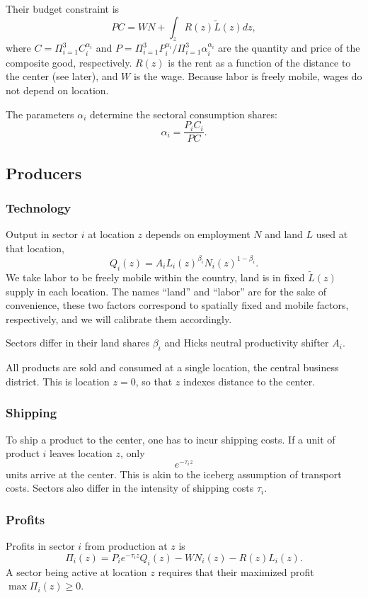 \documentclass[12pt]{article}
\begin{document}

Their budget constraint is
\begin{equation}
\label{eq:BudCons}
PC=WN+\int_z R(z)\tilde{L}(z)dz,
\end{equation}
where $C=\Pi_{i=1}^3C_i^{\alpha_i}$ and $P=\Pi_{i=1}^3P_i^{\alpha_i}/\Pi_{i=1}^3\alpha_i^{\alpha_i}$ are the quantity and price of the composite good, respectively. $R(z)$ is the rent as a function of the distance to the center (see later), and $W$ is the wage. Because labor is freely mobile, wages do not depend on location.

The parameters $\alpha_i$ determine the sectoral consumption shares:
\begin{equation*}
\alpha_i=\frac{P_iC_i}{PC}.
\end{equation*}

\subsection{Producers}
\subsubsection{Technology}
Output in sector $i$ at location $z$ depends on employment $N$ and land $L$ used at that location,
\[
Q_i(z) = A_i L_i(z)^{\beta_i}N_i(z)^{1-\beta_i}.
\]
We take labor to be freely mobile within the country, land is in fixed $\tilde{L}(z)$ supply in each location. The names ``land'' and ``labor'' are for the sake of convenience, these two factors correspond to spatially fixed and mobile factors, respectively, and we will calibrate them accordingly.

Sectors differ in their land shares $\beta_i$ and Hicks neutral productivity shifter $A_i$.

All products are sold and consumed at a single location, the central business district. This is location $z=0$, so that $z$ indexes distance to the center.

\subsubsection{Shipping}
To ship a product to the center, one has to incur shipping costs. If a unit of product $i$ leaves location $z$, only
\[
e^{-\tau_i z}
\]
units arrive at the center. This is akin to the iceberg assumption of transport costs. Sectors also differ in the intensity of shipping costs $\tau_i$.

\subsubsection{Profits}
Profits in sector $i$ from production at $z$ is
\begin{equation}
\label{eq:profit}
\Pi_i(z)=P_ie^{-\tau_iz}Q_i(z)-WN_i(z)-R(z)L_i(z).
\end{equation}
A sector being active at location $z$ requires that their maximized profit $\max\Pi_i(z)\geq0.$
\end{document}
